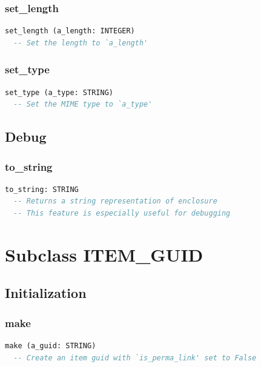 \subsubsection{set\_length}

\begin{lstlisting}[language=Eiffel]
set_length (a_length: INTEGER)
  -- Set the length to `a_length'
\end{lstlisting}

\subsubsection{set\_type}

\begin{lstlisting}[language=Eiffel]
set_type (a_type: STRING)
  -- Set the MIME type to `a_type'
\end{lstlisting}

\subsection{Debug}
\label{sec:item-enclosure-debug}

\subsubsection{to\_string}

\begin{lstlisting}[language=Eiffel]
to_string: STRING
  -- Returns a string representation of enclosure
  -- This feature is especially useful for debugging
\end{lstlisting}


\section{Subclass ITEM\_GUID}
\label{sec:item-guid}

\subsection{Initialization}
\label{sec:item-guid-initialization}

\subsubsection{make}

\begin{lstlisting}[language=Eiffel]
make (a_guid: STRING)
  -- Create an item guid with `is_perma_link' set to False
\end{lstlisting}

